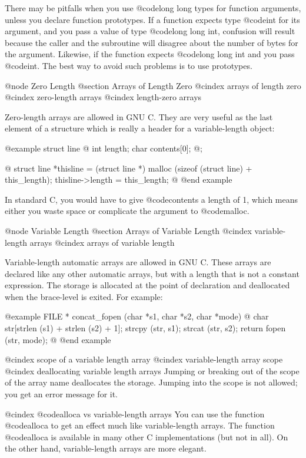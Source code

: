 {There may be pitfalls when you use @code{long long} types for function
arguments, unless you declare function prototypes.  If a function
expects type @code{int} for its argument, and you pass a value of type
@code{long long int}, confusion will result because the caller and the
subroutine will disagree about the number of bytes for the argument.
Likewise, if the function expects @code{long long int} and you pass
@code{int}.  The best way to avoid such problems is to use prototypes.

@node Zero Length
@section Arrays of Length Zero
@cindex arrays of length zero
@cindex zero-length arrays
@cindex length-zero arrays

Zero-length arrays are allowed in GNU C.  They are very useful as the last
element of a structure which is really a header for a variable-length
object:

@example
struct line @{
  int length;
  char contents[0];
@};

@{
  struct line *thisline = (struct line *)
    malloc (sizeof (struct line) + this_length);
  thisline->length = this_length;
@}
@end example

In standard C, you would have to give @code{contents} a length of 1, which
means either you waste space or complicate the argument to @code{malloc}.

@node Variable Length
@section Arrays of Variable Length
@cindex variable-length arrays
@cindex arrays of variable length

Variable-length automatic arrays are allowed in GNU C.  These arrays are
declared like any other automatic arrays, but with a length that is not
a constant expression.  The storage is allocated at the point of
declaration and deallocated when the brace-level is exited.  For
example:

@example
FILE *
concat_fopen (char *s1, char *s2, char *mode)
@{
  char str[strlen (s1) + strlen (s2) + 1];
  strcpy (str, s1);
  strcat (str, s2);
  return fopen (str, mode);
@}
@end example

@cindex scope of a variable length array
@cindex variable-length array scope
@cindex deallocating variable length arrays
Jumping or breaking out of the scope of the array name deallocates the
storage.  Jumping into the scope is not allowed; you get an error
message for it.

@cindex @code{alloca} vs variable-length arrays
You can use the function @code{alloca} to get an effect much like
variable-length arrays.  The function @code{alloca} is available in
many other C implementations (but not in all).  On the other hand,
variable-length arrays are more elegant.

}
